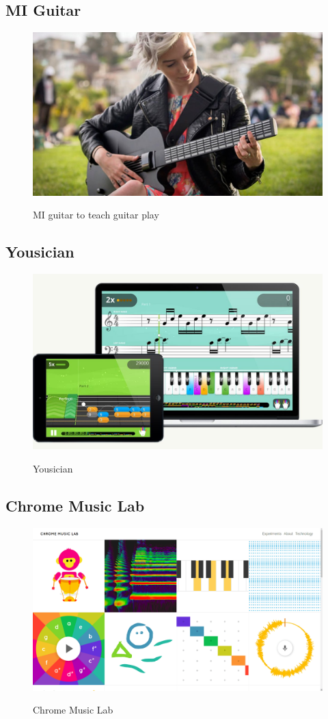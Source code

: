 	\subsection{MI Guitar}
		\begin{figure}[H]
			\centering
			\includegraphics[width=0.8\linewidth]{figure/Analysis/miguitar}
			\label{fig:miguitar}
			\caption{MI guitar to teach guitar play}
		\end{figure}
	
	\subsection{Yousician}
		\begin{figure}[H]
			\centering
			\includegraphics[width=0.8\linewidth]{figure/Analysis/yousician.jpg}
			\label{fig:yousician}
			\caption{Yousician}
		\end{figure}
	\subsection{Chrome Music Lab}
		\begin{figure}[H]
			\centering
			\includegraphics[width=0.8\linewidth]{figure/Analysis/chromeMusicLab.png}
			\label{fig:chromeMusicLab}
			\caption{Chrome Music Lab}
		\end{figure}

